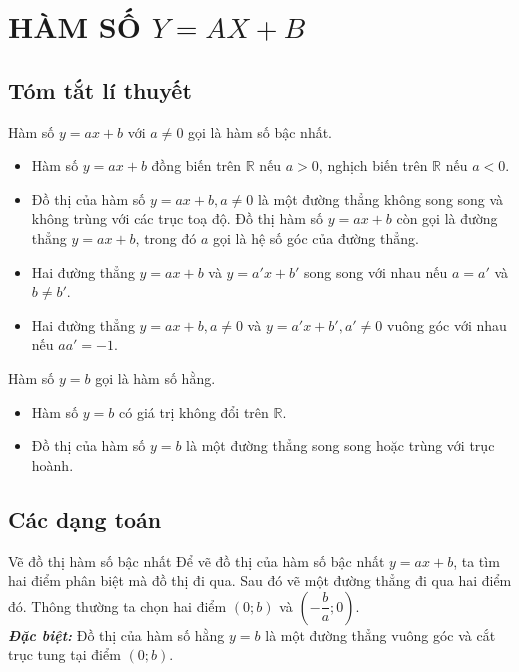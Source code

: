 \section{HÀM SỐ $Y = AX + B$}
\subsection{Tóm tắt lí thuyết}
\begin{dn}
	Hàm số $y=ax+b$ với $a\neq 0$ gọi là hàm số bậc nhất.
\end{dn}
\begin{itemize}
	\item Hàm số $y=ax+b$ đồng biến trên $\mathbb{R}$ nếu $a>0$, nghịch biến trên $\mathbb{R}$ nếu $a<0$.
	\item Đồ thị của hàm số $y=ax+b, a\neq 0$ là một đường thẳng không song song và không trùng với các trục toạ độ. Đồ thị hàm số $y=ax+b$ còn gọi là đường thẳng $y=ax+b$, trong đó $a$ gọi là hệ số góc của đường thẳng.
	\item Hai đường thẳng $y=ax+b$ và $y=a'x+b'$ song song với nhau nếu $a=a'$ và $b\neq b'$.
	\item Hai đường thẳng $y=ax+b, a\neq 0$ và $y=a'x+b', a'\neq 0$ vuông góc với nhau nếu $aa'=-1$.
\end{itemize}

\begin{dn}
	Hàm số $y=b$  gọi là hàm số hằng.
\end{dn}
\begin{itemize}
	\item Hàm số $y=b$ có giá trị không đổi trên $\mathbb{R}$.
	\item Đồ thị của hàm số $y=b$ là một đường thẳng song song hoặc trùng với trục hoành. 
\end{itemize}
\subsection{Các dạng toán}

\begin{dang}{Vẽ đồ thị hàm số bậc nhất} %
	Để vẽ đồ thị của hàm số bậc nhất $y=ax+b$, ta tìm hai điểm phân biệt mà đồ thị đi qua. Sau đó vẽ một đường thẳng đi qua hai điểm đó. Thông thường ta chọn hai điểm $(0; b)$ và $(-\dfrac{b}{a}; 0)$.\\
	\textbf{\textit{Đặc biệt:}} Đồ thị của hàm số hằng $y=b$ là một đường thẳng vuông góc và cắt trục tung tại điểm $(0; b)$.
\end{dang}

